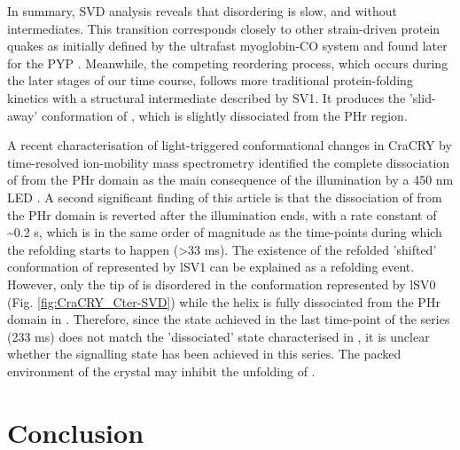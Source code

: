 In summary, SVD analysis reveals that  disordering is slow, and without intermediates. This  transition corresponds closely to other strain-driven protein quakes \parencite{ansariProteinStatesProteinquakes1985} as initially defined by the ultrafast myoglobin-CO system and found later for the PYP \parencite{xieFormationNewBuried2001,renMolecularMovieResolution2001a}.  Meanwhile, the competing reordering process, which occurs during the later stages of our time course, follows more traditional protein-folding kinetics with a structural intermediate described by SV1. It produces the 'slid-away' conformation of , which is slightly dissociated from the PHr region. 

A recent characterisation of light-triggered conformational changes in CraCRY by time-resolved ion-mobility mass spectrometry identified the complete dissociation of  from the PHr domain as the main consequence of the illumination by a 450 nm LED \parencite{zanglTimeResolvedIonMobility2024}. A second significant finding of this article is that the dissociation of  from the PHr domain is reverted after the illumination ends, with a rate constant of \textasciitilde0.2 s, which is in the same order of magnitude as the time-points during which the refolding starts to happen (>33 ms). The existence of the refolded 'shifted' conformation of  represented by lSV1 can be explained as a refolding event. However, only the tip of  is disordered in the conformation represented by lSV0 (Fig. \ref{fig:CraCRY_Cter-SVD}) while the helix is fully dissociated from the PHr domain in \cite{zanglTimeResolvedIonMobility2024}. Therefore, since the state achieved in the last time-point of the series (233 ms) does not match the 'dissociated'  state characterised in \cite{zanglTimeResolvedIonMobility2024}, it is unclear whether the signalling state has been achieved in this series. The packed environment of the crystal may inhibit the unfolding of . 

\section{Conclusion}

